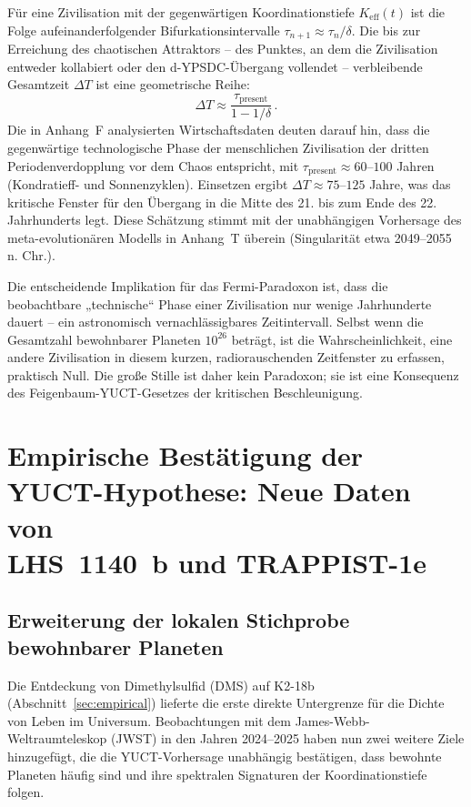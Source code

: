 \documentclass[11pt,a4paper]{article}
\begin{document}
	Für eine Zivilisation mit der gegenwärtigen Koordinationstiefe \(K_{\mathrm{eff}}(t)\) ist die Folge aufeinanderfolgender Bifurkationsintervalle \(\tau_{n+1} \approx \tau_{n} / \delta\). Die bis zur Erreichung des chaotischen Attraktors – des Punktes, an dem die Zivilisation entweder kollabiert oder den d-YPSDC-Übergang vollendet – verbleibende Gesamtzeit \(\Delta T\) ist eine geometrische Reihe:
	\begin{equation}
		\Delta T \approx \frac{\tau_{\mathrm{present}}}{1 - 1/\delta} \, .
	\end{equation}
	Die in Anhang~F analysierten Wirtschaftsdaten deuten darauf hin, dass die gegenwärtige technologische Phase der menschlichen Zivilisation der dritten Periodenverdopplung vor dem Chaos entspricht, mit \(\tau_{\mathrm{present}} \approx 60\)–\(100\) Jahren (Kondratieff- und Sonnenzyklen). Einsetzen ergibt \(\Delta T \approx 75\)–\(125\) Jahre, was das kritische Fenster für den Übergang in die Mitte des 21. bis zum Ende des 22. Jahrhunderts legt. Diese Schätzung stimmt mit der unabhängigen Vorhersage des meta-evolutionären Modells in Anhang~T überein (Singularität etwa 2049–2055 n. Chr.).
	
	Die entscheidende Implikation für das Fermi-Paradoxon ist, dass die beobachtbare „technische“ Phase einer Zivilisation nur wenige Jahrhunderte dauert – ein astronomisch vernachlässigbares Zeitintervall. Selbst wenn die Gesamtzahl bewohnbarer Planeten \(10^{26}\) beträgt, ist die Wahrscheinlichkeit, eine andere Zivilisation in diesem kurzen, radiorauschenden Zeitfenster zu erfassen, praktisch Null. Die große Stille ist daher kein Paradoxon; sie ist eine Konsequenz des Feigenbaum-YUCT-Gesetzes der kritischen Beschleunigung.
	
	\section{Empirische Bestätigung der YUCT-Hypothese: Neue Daten von \\ LHS~1140~b und TRAPPIST-1e}
	\label{sec:confirmation}
	
	\subsection{Erweiterung der lokalen Stichprobe bewohnbarer Planeten}
	Die Entdeckung von Dimethylsulfid (DMS) auf K2-18b (Abschnitt~\ref{sec:empirical}) lieferte die erste direkte Untergrenze für die Dichte von Leben im Universum. Beobachtungen mit dem James-Webb-Weltraumteleskop (JWST) in den Jahren 2024–2025 haben nun zwei weitere Ziele hinzugefügt, die die YUCT-Vorhersage unabhängig bestätigen, dass bewohnte Planeten häufig sind und ihre spektralen Signaturen der Koordinationstiefe folgen.
	
\end{document}
